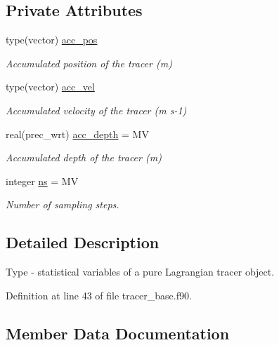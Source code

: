 \subsection*{Private Attributes}
\begin{DoxyCompactItemize}
\item 
type(vector) \mbox{\hyperlink{structtracer__base__mod_1_1tracer__stats__class_aa60964087b2515e7ae6824f38470594e}{acc\+\_\+pos}}
\begin{DoxyCompactList}\small\item\em Accumulated position of the tracer (m) \end{DoxyCompactList}\item 
type(vector) \mbox{\hyperlink{structtracer__base__mod_1_1tracer__stats__class_adab48ad9efa9431a5101e6f22c6b16d1}{acc\+\_\+vel}}
\begin{DoxyCompactList}\small\item\em Accumulated velocity of the tracer (m s-\/1) \end{DoxyCompactList}\item 
real(prec\+\_\+wrt) \mbox{\hyperlink{structtracer__base__mod_1_1tracer__stats__class_ace9d4e6796a669eba7001671ab0b38b8}{acc\+\_\+depth}} = MV
\begin{DoxyCompactList}\small\item\em Accumulated depth of the tracer (m) \end{DoxyCompactList}\item 
integer \mbox{\hyperlink{structtracer__base__mod_1_1tracer__stats__class_a5e01cdc2592ecf31711151cf54e3b4d5}{ns}} = MV
\begin{DoxyCompactList}\small\item\em Number of sampling steps. \end{DoxyCompactList}\end{DoxyCompactItemize}


\subsection{Detailed Description}
Type -\/ statistical variables of a pure Lagrangian tracer object. 

Definition at line 43 of file tracer\+\_\+base.\+f90.



\subsection{Member Data Documentation}
\mbox{\label{structtracer__base__mod_1_1tracer__stats__class_ace9d4e6796a669eba7001671ab0b38b8}} 
